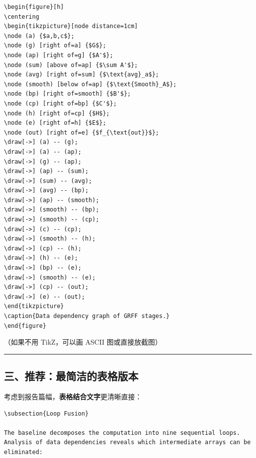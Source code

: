 \documentclass[11pt, a4paper]{article}
\begin{document}
\begin{aibox}
\begin{tcolorbox}[colback=white,colframe=gray!50!white,boxrule=0.5pt,arc=2pt,left=5pt,right=5pt,top=5pt,bottom=5pt]
\begin{verbatim}
\begin{figure}[h]
\centering
\begin{tikzpicture}[node distance=1cm]
\node (a) {$a,b,c$};
\node (g) [right of=a] {$G$};
\node (ap) [right of=g] {$A'$};
\node (sum) [above of=ap] {$\sum A'$};
\node (avg) [right of=sum] {$\text{avg}_a$};
\node (smooth) [below of=ap] {$\text{Smooth}_A$};
\node (bp) [right of=smooth] {$B'$};
\node (cp) [right of=bp] {$C'$};
\node (h) [right of=cp] {$H$};
\node (e) [right of=h] {$E$};
\node (out) [right of=e] {$f_{\text{out}}$};
\draw[->] (a) -- (g);
\draw[->] (a) -- (ap);
\draw[->] (g) -- (ap);
\draw[->] (ap) -- (sum);
\draw[->] (sum) -- (avg);
\draw[->] (avg) -- (bp);
\draw[->] (ap) -- (smooth);
\draw[->] (smooth) -- (bp);
\draw[->] (smooth) -- (cp);
\draw[->] (c) -- (cp);
\draw[->] (smooth) -- (h);
\draw[->] (cp) -- (h);
\draw[->] (h) -- (e);
\draw[->] (bp) -- (e);
\draw[->] (smooth) -- (e);
\draw[->] (cp) -- (out);
\draw[->] (e) -- (out);
\end{tikzpicture}
\caption{Data dependency graph of GRFF stages.}
\end{figure}
\end{verbatim}
\end{tcolorbox}

（如果不用 TikZ，可以画 ASCII 图或直接放截图）

\begin{center}\rule{\textwidth}{0.4pt}\end{center}

\subsection*{三、推荐：最简洁的表格版本}

考虑到报告篇幅，\textbf{表格结合文字}更清晰直接：

\begin{tcolorbox}[colback=white,colframe=gray!50!white,boxrule=0.5pt,arc=2pt,left=5pt,right=5pt,top=5pt,bottom=5pt]
\begin{verbatim}
\subsection{Loop Fusion}

The baseline decomposes the computation into nine sequential loops.
Analysis of data dependencies reveals which intermediate arrays can be
eliminated:


\end{verbatim}
\end{tcolorbox}
\end{aibox}
\end{document}

